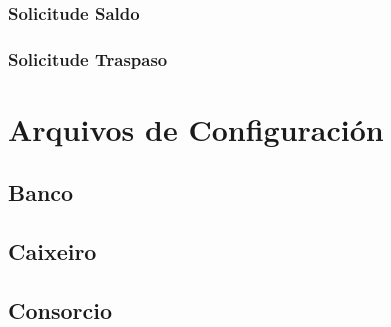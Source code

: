\documentclass[a4paper,titlepage]{article}
\begin{document}
\subsubsection{Solicitude Saldo}

\subsubsection{Solicitude Traspaso}


\clearpage
\newpage

\section{Arquivos de Configuración}
\subsection{Banco}


\subsection{Caixeiro}


\subsection{Consorcio}

\end{document}
